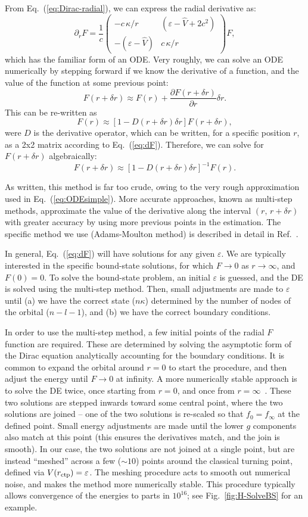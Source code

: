 \documentclass[10pt,twocolumn,a4paper]{article}%
\newcommand{\matr}[4]{\ensuremath{\begin{pmatrix}#1&#2\\#3&#4\end{pmatrix}}}	%
\newcommand{\be}{\begin{equation}}
\newcommand{\ee}{\end{equation}}
\def\en{\ensuremath{\varepsilon}}
\def\p{\ensuremath{\partial}}
\renewcommand{\k}{\ensuremath{\kappa}}
\begin{document}
From Eq.~(\ref{eq:Dirac-radial}), we can express the radial derivative as:
\be\label{eq:dF}
\p_r F  =\frac{1}{c} \matr 	{-c\,{\k}/{r}} 	{(\en - \hat V+2c^2)}  {-(\en - \hat V)} 	 {c\,{\k}/{r}}F,
\ee
which has the familiar form of an ODE.
Very roughly, we can solve an ODE numerically by stepping forward if we know the derivative of a function, and the value of the function at some previous point:
\be\label{eq:ODEsimple}
F(r+\delta r) \approx F(r) + \frac{\p F(r+\delta r)}{\p r}\delta r.
\ee
This can be re-written as
\[
F(r) \approx \left[1 - D(r+\delta r) \delta r\right]F(r+\delta r),
\]
were $D$ is the derivative operator, which can be written, for a specific position $r$, as a 2x2 matrix according to Eq.~(\ref{eq:dF}).
Therefore, we can solve for $ F(r+\delta r)$ algebraically:
\[
 F(r+\delta r) \approx \left[1 - D(r+\delta r) \delta r\right]^{-1} F(r) .
\]

As written, this method is far too crude, owing to the very rough approximation used in Eq.~(\ref{eq:ODEsimple}).
More accurate approaches, known as multi-step methods, approximate the value of the derivative along the interval $(r, \, r+\delta r)$ with greater accuracy by using more previous points in the estimation. 
The specific method we use (Adams-Moulton method) is described in detail in Ref.~\cite{JohnsonBook2007}.



In general, Eq.~(\ref{eq:dF}) will have solutions for any given $\en$. 
We are typically interested in the specific bound-state solutions, for which $F\to0$ as $r\to\infty$, and $F(0)=0$.
To solve the bound-state problem, an initial $\en$ is guessed, and the DE is solved using the multi-step method.
Then, small adjustments are made to $\en$ until (a) we have the correct state ($n\k$) determined by the number of nodes of the orbital ($n-l-1$), and (b) we have the correct boundary conditions.



In order to use the multi-step method, a few initial points of the radial $F$ function are required.
These are determined by solving the asymptotic form of the Dirac equation analytically accounting for the boundary conditions.
It is common to expand the orbital around $r=0$ to start the procedure, and then adjust the energy until $F\to0$ at infinity.
%
A more numerically stable approach is to solve the DE twice, once starting from $r=0$, and once from $r=\infty$~\cite{JohnsonBook2007}.
These two solutions are stepped inwards toward some central point, where the two solutions are joined -- one of the two solutions is re-scaled so that $f_0=f_\infty$ at the defined point.
Small energy adjustments are made until the lower $g$ components also match at this point (this ensures the derivatives match, and the join is smooth).
In our case, the two solutions are not joined at a single point, but are instead ``meshed'' across a few ($\sim10$)  points around the classical turning point, defined via $V(r_{\rm ctp}) = \en$.
The meshing procedure acts to smooth out numerical noise, and makes the method more numerically stable.
This procedure typically allows convergence of the energies to parts in $10^{16}$;
see Fig.~\ref{fig:H-SolveBS} for an example.
\end{document}
